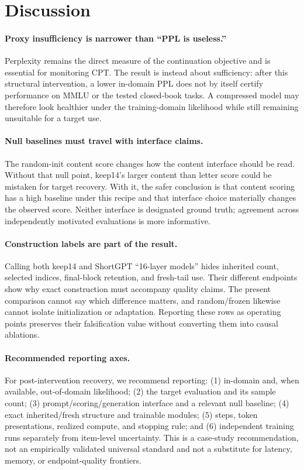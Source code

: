 \section{Discussion}
\label{sec:discussion}

\paragraph{Proxy insufficiency is narrower than ``PPL is useless.''}
Perplexity remains the direct measure of the continuation objective and is
essential for monitoring CPT. The result is instead about sufficiency: after
this structural intervention, a lower in-domain PPL does not by itself certify
performance on MMLU or the tested closed-book tasks. A compressed model may
therefore look healthier under the training-domain likelihood while still
remaining unsuitable for a target use.

\paragraph{Null baselines must travel with interface claims.}
The random-init content score changes how the content interface should be read.
Without that null point, keep14's larger content than letter score could be
mistaken for target recovery. With it, the safer conclusion is that content
scoring has a high baseline under this recipe and that interface choice
materially changes the observed score. Neither interface is designated ground
truth; agreement across independently motivated evaluations is more
informative.

\paragraph{Construction labels are part of the result.}
Calling both keep14 and ShortGPT ``16-layer models'' hides inherited count,
selected indices, final-block retention, and fresh-tail use. Their different
endpoints show why exact construction must accompany quality claims. The
present comparison cannot say which difference matters, and random/frozen
likewise cannot isolate initialization or adaptation. Reporting these rows as
operating points preserves their falsification value without converting them
into causal ablations.

\paragraph{Recommended reporting axes.}
For post-intervention recovery, we recommend reporting:
(1) in-domain and, when available, out-of-domain likelihood;
(2) the target evaluation and its sample count;
(3) prompt/scoring/generation interface and a relevant null baseline;
(4) exact inherited/fresh structure and trainable modules;
(5) steps, token presentations, realized compute, and stopping rule; and
(6) independent training runs separately from item-level uncertainty.
This is a case-study recommendation, not an empirically validated universal
standard and not a substitute for latency, memory, or endpoint-quality
frontiers.
